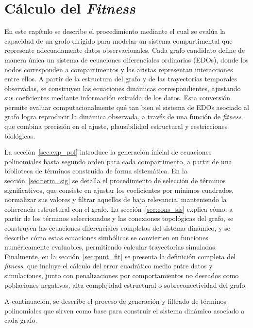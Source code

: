 \chapter{C\'alculo del \textit{Fitness}}\label{chapter:fitness}

En este capítulo se describe el procedimiento mediante el cual se evalúa la capacidad de un grafo dirigido para modelar un sistema compartimental que represente 
adecuadamente datos observacionales. Cada grafo candidato define de manera única un sistema de ecuaciones diferenciales ordinarias (EDOs), donde los nodos corresponden 
a compartimentos y las aristas representan interacciones entre ellos. A partir de la estructura del grafo y de las trayectorias temporales observadas, se construyen 
las ecuaciones dinámicas correspondientes, ajustando sus coeficientes mediante información extraída de los datos. Esta conversión permite evaluar computacionalmente 
qué tan bien el sistema de EDOs asociado al grafo logra reproducir la dinámica observada, a través de una función de \textit{fitness} que combina precisión en el 
ajuste, plausibilidad estructural y restricciones biológicas.

La sección~\ref{sec:exp_pol} introduce la generación inicial de ecuaciones polinomiales hasta segundo orden para cada compartimento, a partir de una biblioteca de términos 
construida de forma sistemática. En la sección~\ref{sec:term_sig} se detalla el procedimiento de selección de términos significativos, que consiste en ajustar los coeficientes 
por mínimos cuadrados, normalizar sus valores y filtrar aquellos de baja relevancia, manteniendo la coherencia estructural con el grafo. La sección~\ref{sec:cons_sis} 
explica cómo, a partir de los términos seleccionados y las conexiones topológicas del grafo, se construyen las ecuaciones diferenciales completas del sistema dinámico, 
y se describe cómo estas ecuaciones simbólicas se 
convierten en funciones numéricamente evaluables, permitiendo calcular trayectorias simuladas. Finalmente, en la sección~\ref{sec:punt_fit} se presenta la definición completa del 
\textit{fitness}, que incluye el cálculo del error cuadrático medio entre datos y simulaciones, junto con penalizaciones por comportamientos no deseados como 
poblaciones negativas, alta complejidad estructural o sobreconectividad del grafo.

A continuación, se describe el proceso de generación y filtrado de términos polinomiales que sirven como base para construir el sistema dinámico asociado a cada grafo.

